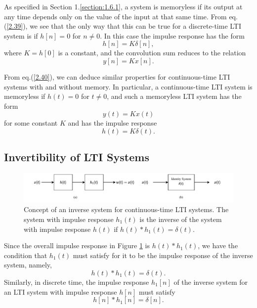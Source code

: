 \documentclass[a4paper,twoside]{book}
\begin{document}
As specified in Section 1.\ref{section:1.6.1}, a system is memoryless if its output at any time depends only on the value of the input at that same time. From eq.\;(\ref{2.39}), we see that the only way that this can be true for a discrete-time LTI system is if $h[n]=0$ for $n\ne 0$. In this case the impulse response has the form
\begin{equation}
    h[n]=K\delta[n],
    \label{2.62}
\end{equation}
where $K=h[0]$ is a constant, and the convolution sum reduces to the relation
\begin{equation}
    y[n]=Kx[n].
\end{equation}

From eq.\;(\ref{2.40}), we can deduce similar properties for continuous-time LTI systems with and without memory. In particular, a continuous-time LTI system is memoryless if $h(t)=0$ for $t\ne 0$, and such a memoryless LTI system has the form
\begin{equation}
    y(t)=Kx(t)
    \label{2.64}
\end{equation}
for some constant $K$ and has the impulse response
\begin{equation}
    h(t)=K\delta(t).
    \label{2.65}
\end{equation}

\subsection{Invertibility of LTI Systems}

\begin{figure}[htbp]
    \centering
    \includegraphics[width=\linewidth]{Fig6.pdf}
    \caption{Concept of an inverse system for continuous-time LTI systems. The system with impulse response $h_1(t)$ is the inverse of the system with impulse response $h(t)$ if $h(t)*h_1(t)=\delta(t)$.}
    \label{Fig6}
\end{figure}

Since the overall impulse response in Figure \ref{Fig6} is $h(t)*h_1(t)$, we have the condition that $h_1(t)$ must satisfy for it to be the impulse response of the inverse system, namely,
\begin{equation}
    h(t)*h_1(t)=\delta(t).
    \label{2.66}
\end{equation}
Similarly, in discrete time, the impulse response $h_1[n]$ of the inverse system for an LTI system with impulse response $h[n]$ must satisfy
\begin{equation}
    h[n]*h_1[n]=\delta[n].
    \label{2.67}
\end{equation}
\end{document}
